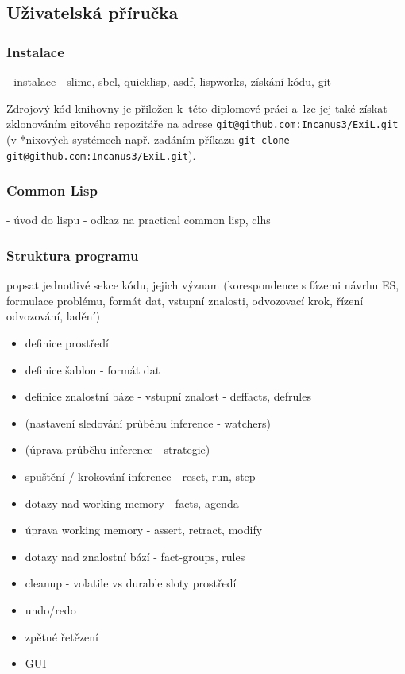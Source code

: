 \subsection{Uživatelská příručka}
\subsubsection{Instalace}
- instalace - slime, sbcl, quicklisp, asdf, lispworks, získání kódu, git

Zdrojový kód knihovny je přiložen k~této diplomové práci a~lze jej také získat
zklonováním gitového\footnotemark{} repozitáře na adrese
\verb|git@github.com:Incanus3/ExiL.git| (v *nixových systémech např. zadáním
příkazu \verb|git clone git@github.com:Incanus3/ExiL.git|).

\subsubsection{Common Lisp}
- úvod do lispu - odkaz na practical common lisp, clhs

\subsubsection{Struktura programu}
popsat jednotlivé sekce kódu, jejich význam (korespondence s fázemi návrhu ES,
formulace problému, formát dat, vstupní znalosti, odvozovací krok, řízení
odvozování, ladění)
\begin{itemize}
  \item definice prostředí
  \item definice šablon - formát dat
  \item definice znalostní báze - vstupní znalost - deffacts, defrules
  \item (nastavení sledování průběhu inference - watchers)
  \item (úprava průběhu inference - strategie)
  \item spuštění / krokování inference - reset, run, step
  \item dotazy nad working memory - facts, agenda
  \item úprava working memory - assert, retract, modify
  \item dotazy nad znalostní bází - fact-groups, rules
  \item cleanup - volatile vs durable sloty prostředí
  \item undo/redo
  \item zpětné řetězení
  \item GUI
\end{itemize}

